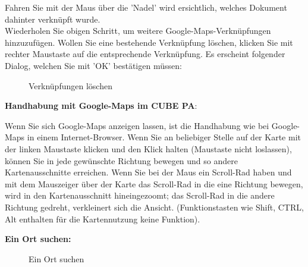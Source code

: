 Fahren Sie mit der Maus über die 'Nadel' wird ersichtlich, welches Dokument dahinter verknüpft wurde. \\

Wiederholen Sie obigen Schritt, um weitere Google-Maps-Verknüpfungen hinzuzufügen. Wollen Sie eine bestehende Verknüpfung löschen, klicken Sie mit rechter Maustaste auf die entsprechende Verknüpfung. Es erscheint folgender Dialog, welchen Sie mit 'OK' bestätigen müssen: 

\begin{figure}[H]
\caption{Verknüpfungen löschen}
\end{figure}

\vspace{\baselineskip}
\pagebreak

\textbf{Handhabung mit Google-Maps im CUBE PA}:

Wenn Sie sich Google-Maps anzeigen lassen, ist die Handhabung wie bei Google-Maps in einem Internet-Browser. Wenn Sie an beliebiger Stelle auf der Karte mit der linken Maustaste klicken und den Klick halten (Maustaste nicht loslassen), können Sie in jede gewünschte Richtung bewegen und so andere Kartenausschnitte erreichen. Wenn Sie bei der Maus ein Scroll-Rad haben und mit dem Mauszeiger über der Karte das Scroll-Rad in die eine Richtung bewegen, wird in den Kartenausschnitt hineingezoomt; das Scroll-Rad in die andere Richtung gedreht, verkleinert sich die Ansicht. (Funktionstasten wie Shift, CTRL, Alt enthalten für die Kartennutzung keine Funktion).

\vspace{\baselineskip}

\textbf{Ein Ort suchen:} 

\begin{figure}[H]
\caption{Ein Ort suchen}
\end{figure}

